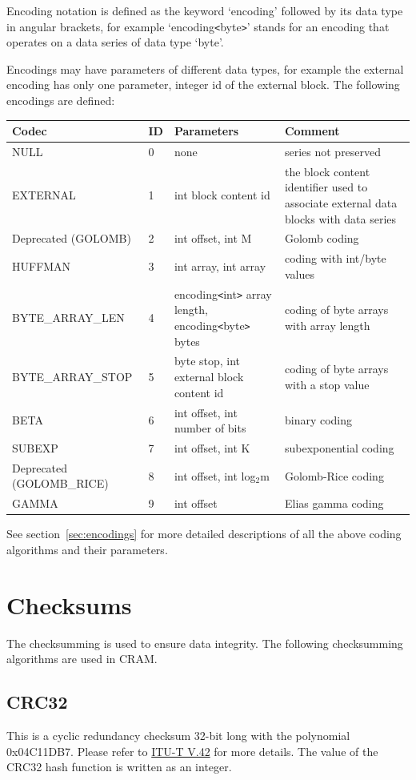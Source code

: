 \documentclass[a4paper]{article}
\begin{document}
Encoding notation is defined as the keyword `encoding' followed by its data type 
in angular brackets, for example `encoding\texttt{<}byte\texttt{>}' stands for 
an encoding that operates on a data series of data type `byte'. 

Encodings may have parameters of different data types, for example the external 
encoding has only one parameter, integer id of the external block. The following 
encodings are defined: 

\begin{tabular}{|l|l|>{\raggedright}p{155pt}|>{\raggedright}p{160pt}|}
\hline
\textbf{Codec} & \textbf{ID} & \textbf{Parameters} & \textbf{Comment}\tabularnewline
\hline
NULL & 0 & none & series not preserved\tabularnewline
\hline
EXTERNAL & 1 & int block content id & the block content identifier used to associate 
external data blocks with data series\tabularnewline
\hline
Deprecated (GOLOMB) & 2 & int offset, int M & Golomb coding\tabularnewline
\hline
HUFFMAN & 3 & int array, int array & coding with int/byte values\tabularnewline
\hline
BYTE\_ARRAY\_LEN & 4 & encoding\texttt{<}int\texttt{>} array length, encoding\texttt{<}byte\texttt{>} 
bytes & coding of byte arrays with array length\tabularnewline
\hline
BYTE\_ARRAY\_STOP & 5 & byte stop, int external block\linebreak{}
content id & coding of byte arrays with a stop value \tabularnewline
\hline
BETA & 6 & int offset, int number of bits & binary coding\tabularnewline
\hline
SUBEXP & 7 & int offset, int K & subexponential coding\tabularnewline
\hline
Deprecated (GOLOMB\_RICE) & 8 & int offset, int log$_{\text{2}}$m & Golomb-Rice coding\tabularnewline
\hline
GAMMA & 9 & int offset & Elias gamma coding\tabularnewline
\hline
\end{tabular}

See section~\ref{sec:encodings} for more detailed descriptions of all the above coding algorithms and their parameters.

\section{\textbf{Checksums}}
The checksumming is used to ensure data integrity. The following checksumming algorithms are used in CRAM.
\subsection{\textbf{CRC32}}
This is a cyclic redundancy checksum 32-bit long with the polynomial 0x04C11DB7. Please refer to \href{http://www.itu.int/rec/recommendation.asp?type=folders&lang=e&parent=T-REC-V.42}{ITU-T V.42} for more details. The value of the CRC32 hash function is written as an integer.
\end{document}
